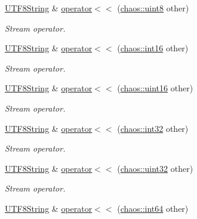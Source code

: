 \begin{DoxyCompactItemize}
\hyperlink{classchaos_1_1str_1_1_u_t_f8_string}{U\+T\+F8\+String} \& \hyperlink{classchaos_1_1str_1_1_u_t_f8_string_abfce18f938382812ffeb3c399fdf679e}{operator$<$$<$} (\hyperlink{namespacechaos_a229e18634387996c2712d57f184bf363}{chaos\+::uint8} other)
\begin{DoxyCompactList}\small\item\em Stream operator. \end{DoxyCompactList}\item 
\hyperlink{classchaos_1_1str_1_1_u_t_f8_string}{U\+T\+F8\+String} \& \hyperlink{classchaos_1_1str_1_1_u_t_f8_string_a970df73b6bbb3d31fe5bcf53bc654be6}{operator$<$$<$} (\hyperlink{namespacechaos_a23112b8188c8a6ad32a86041fb4c088e}{chaos\+::int16} other)
\begin{DoxyCompactList}\small\item\em Stream operator. \end{DoxyCompactList}\item 
\hyperlink{classchaos_1_1str_1_1_u_t_f8_string}{U\+T\+F8\+String} \& \hyperlink{classchaos_1_1str_1_1_u_t_f8_string_aa1ae66a5b283279df734eab632e398cf}{operator$<$$<$} (\hyperlink{namespacechaos_ac3888b1c9e56da7fbbdb3ab8425b4068}{chaos\+::uint16} other)
\begin{DoxyCompactList}\small\item\em Stream operator. \end{DoxyCompactList}\item 
\hyperlink{classchaos_1_1str_1_1_u_t_f8_string}{U\+T\+F8\+String} \& \hyperlink{classchaos_1_1str_1_1_u_t_f8_string_a1c174fd024e1535a2f485e290540a2a1}{operator$<$$<$} (\hyperlink{namespacechaos_ad1de7efb430365afd2c9446a0f522a90}{chaos\+::int32} other)
\begin{DoxyCompactList}\small\item\em Stream operator. \end{DoxyCompactList}\item 
\hyperlink{classchaos_1_1str_1_1_u_t_f8_string}{U\+T\+F8\+String} \& \hyperlink{classchaos_1_1str_1_1_u_t_f8_string_a99aa07fcc88a65befe5e530933839fab}{operator$<$$<$} (\hyperlink{namespacechaos_a3b3a47ba1e284655bf1a30c441121c60}{chaos\+::uint32} other)
\begin{DoxyCompactList}\small\item\em Stream operator. \end{DoxyCompactList}\item 
\hyperlink{classchaos_1_1str_1_1_u_t_f8_string}{U\+T\+F8\+String} \& \hyperlink{classchaos_1_1str_1_1_u_t_f8_string_a5fac3cdc0e1aa0bdefce09a0dab085cf}{operator$<$$<$} (\hyperlink{namespacechaos_a46c61f58d99879b936f58234b9a05e0c}{chaos\+::int64} other)

\end{DoxyCompactItemize}
